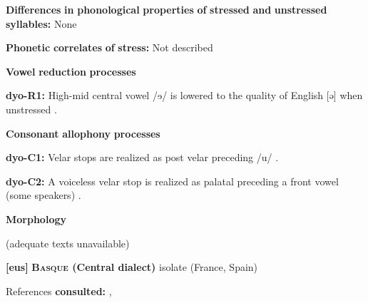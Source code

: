 \begin{styleBody}
\textbf{Differences} \textbf{in} \textbf{phonological} \textbf{properties} \textbf{of} \textbf{stressed} \textbf{and} \textbf{unstressed} \textbf{syllables:} None
\end{styleBody}

\begin{styleBody}
\textbf{Phonetic} \textbf{correlates} \textbf{of} \textbf{stress:} Not described
\end{styleBody}

\begin{styleBody}
\textbf{Vowel} \textbf{reduction} \textbf{processes}
\end{styleBody}

\begin{styleBody}
\textbf{dyo-R1:} High-mid central vowel /ɘ/ is lowered to the quality of English [ə] when unstressed \citep[6]{Sapir1965}.
\end{styleBody}

\begin{styleBody}
\textbf{Consonant} \textbf{allophony} \textbf{processes}
\end{styleBody}

\begin{styleBody}
\textbf{dyo-C1:} Velar stops are realized as post velar preceding /u/ \citep[5]{Sapir1965}.
\end{styleBody}

\begin{styleBody}
\textbf{dyo-C2:} A voiceless velar stop is realized as palatal preceding a front vowel (some speakers) \citep{Sapir1965}.
\end{styleBody}

\begin{styleBody}
\textbf{Morphology}
\end{styleBody}

\begin{styleBody}
(adequate texts unavailable)
\end{styleBody}

\begin{styleBody}
\textbf{[eus]}   \textbf{\textsc{Basque} \textbf{(Central} \textbf{dialect)}}  isolate (France, Spain)
\end{styleBody}

\begin{styleBody}
References \textbf{consulted:} \citet{Hualde2003}, \citet{SaltarelliEtAl1988}
\end{styleBody}

